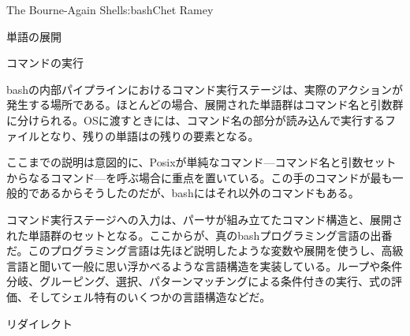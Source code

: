 \begin{aosachapter}{The Bourne-Again Shell}{s:bash}{Chet Ramey}
\begin{aosasect1}{単語の展開}
\end{aosasect1}

\begin{aosasect1}{コマンドの実行}

bashの内部パイプラインにおけるコマンド実行ステージは、実際のアクションが発生する場所である。ほとんどの場合、展開された単語群はコマンド名と引数群に分けられる。OSに渡すときには、コマンド名の部分が読み込んで実行するファイルとなり、残りの単語はの残りの要素となる。

ここまでの説明は意図的に、Posixが単純なコマンド---コマンド名と引数セットからなるコマンド---を呼ぶ場合に重点を置いている。この手のコマンドが最も一般的であるからそうしたのだが、bashにはそれ以外のコマンドもある。

コマンド実行ステージへの入力は、パーサが組み立てたコマンド構造と、展開された単語群のセットとなる。ここからが、真のbashプログラミング言語の出番だ。このプログラミング言語は先ほど説明したような変数や展開を使うし、高級言語と聞いて一般に思い浮かべるような言語構造を実装している。ループや条件分岐、グルーピング、選択、パターンマッチングによる条件付きの実行、式の評価、そしてシェル特有のいくつかの言語構造などだ。

\begin{aosasect2}{リダイレクト}


\end{aosasect2}
\end{aosasect1}
\end{aosachapter}
